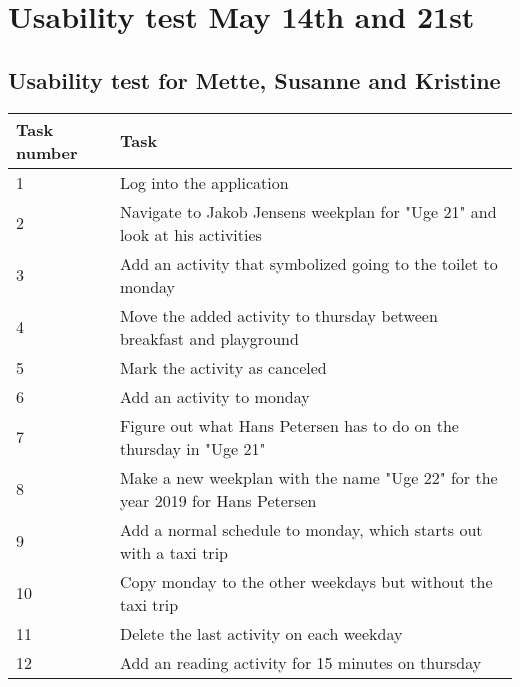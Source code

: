 \newpage
\chapter{Usability test May 14th and 21st}\label{usability-test-14-05}
\section{Usability test for Mette, Susanne and Kristine}\label{usability-test-14-05-mette}
\begin{table}[H]
    \small
    \begin{tabular}{|p{1.3cm}|p{12cm}|}
    \hline
    Task number  &Task                                                                            \\ \hline
    1 & Log into the application                                                                           \\ \hline
    2 & Navigate to Jakob Jensens weekplan for "Uge 21" and look at his activities                   \\ \hline
    3 & Add an activity that symbolized going to the toilet to monday                                           \\ \hline
    4 & Move the added activity to thursday between breakfast and playground                         \\ \hline
    5 & Mark the activity as canceled                                                                 \\ \hline
    6 & Add an activity to monday                                                                      \\ \hline
    7 & Figure out what Hans Petersen has to do on the thursday in "Uge 21"                              \\ \hline
    8 & Make a new weekplan with the name "Uge 22" for the year 2019 for Hans Petersen                              \\ \hline
    9 & Add a normal schedule to monday, which starts out with a taxi trip                          \\ \hline
    10 & Copy monday to the other weekdays but without the taxi trip                                        \\ \hline
    11 & Delete the last activity on each weekday                                                        \\ \hline
    12 & Add an reading activity for 15 minutes on thursday                                              \\ \hline

\end{tabular}
\end{table}
